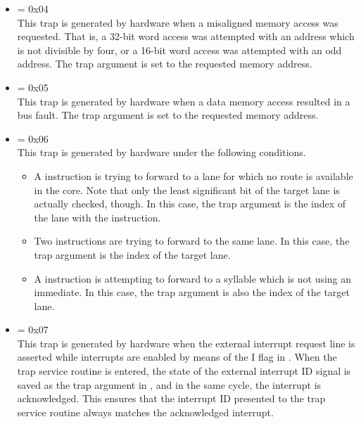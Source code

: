 \begin{itemize}
\setcounter{enumi}{3}
\item {} \label{trap:MISALIGNED_ACCESS}  = 0x04
\\[6 pt]
This trap is generated by hardware when a misaligned memory access was
requested. That is, a 32-bit word access was attempted with an address which is
not divisible by four, or a 16-bit word access was attempted with an odd
address. The trap argument is set to the requested memory address.

\setcounter{enumi}{4}
\item {} \label{trap:DMEM_FAULT}  = 0x05
\\[6 pt]
This trap is generated by hardware when a data memory access resulted in a bus
fault. The trap argument is set to the requested memory address.

\setcounter{enumi}{5}
\item {} \label{trap:LIMMH_FAULT}  = 0x06
\\[6 pt]
This trap is generated by hardware under the following conditions.

\begin{itemize}

\item A  instruction is trying to forward to a lane for which no
route is available in the core. Note that only the least significant bit of the
target lane is actually checked, though. In this case, the trap argument is the
index of the lane with the  instruction.

\item Two  instructions are trying to forward to the same lane. In
this case, the trap argument is the index of the target lane.

\item A  instruction is attempting to forward to a syllable which
is not using an immediate. In this case, the trap argument is also the index of
the target lane.

\end{itemize}

\setcounter{enumi}{6}
\item {} \label{trap:EXT_INTERRUPT}  = 0x07
\\[6 pt]
This trap is generated by hardware when the external interrupt request line is
asserted while interrupts are enabled by means of the I flag in . When
the trap service routine is entered, the state of the external interrupt ID
signal is saved as the trap argument in , and in the same cycle, the
interrupt is acknowledged. This ensures that the interrupt ID presented to the
trap service routine always matches the acknowledged interrupt.


\end{itemize}

